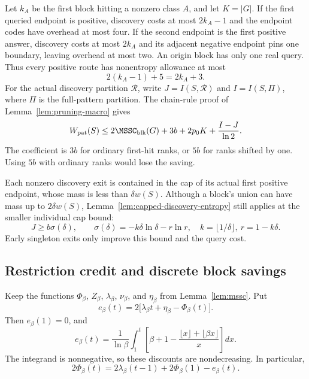 Let $k_A$ be the first block hitting a nonzero class $A$, and let
$K=|G|$. If the first queried endpoint is positive, discovery costs
at most $2k_A-1$ and the endpoint codes have overhead at most four.
If the second endpoint is the first positive answer, discovery costs
at most $2k_A$ and its adjacent negative endpoint pins one boundary,
leaving overhead at most two. An origin block has only one real query.
Thus every positive route has nonentropy allowance at most
\[
 2(k_A-1)+5=2k_A+3.
\]
For the actual discovery partition $\mathcal R$, write
$J=I(S,\mathcal R)$ and $I=I(S,\Pi)$, where $\Pi$ is the full-pattern
partition. The chain-rule proof of Lemma~\ref{lem:pruning-macro} gives
\begin{equation}\label{eq:poly-block-stage}
 W_{\mathrm{pat}}(S)\le
 2\MSSC_{\mathrm{blk}}(G)+3b+2p_0K+\frac{I-J}{\ln2}.
\end{equation}
The coefficient is $3b$ for ordinary first-hit ranks, or $5b$ for ranks
shifted by one. Using $5b$ with ordinary ranks would lose the saving.

Each nonzero discovery exit is contained in the cap of its actual
first positive endpoint, whose mass is less than $\delta w(S)$.
Although a block's union can have mass up to $2\delta w(S)$,
Lemma~\ref{lem:capped-discovery-entropy} still applies at the smaller
individual cap bound:
\begin{equation}\label{eq:poly-block-entropy}
 J\ge b\sigma(\delta),\qquad
 \sigma(\delta)=-k\delta\ln\delta-r\ln r,
 \quad k=\lfloor1/\delta\rfloor,\ r=1-k\delta.
\end{equation}
Early singleton exits only improve this bound and the query cost.

\subsection{Restriction credit and discrete block savings}

Keep the functions $\Phi_\beta$, $Z_\beta$, $\lambda_\beta$,
$\nu_\beta$, and $\eta_\beta$ from Lemma~\ref{lem:mssc}. Put
\[
 e_\beta(t)=2\bigl[\lambda_\beta t+\eta_\beta-\Phi_\beta(t)\bigr].
\]
Then $e_\beta(1)=0$, and
\[
 e_\beta(t)=\frac1{\ln\beta}\int_1^t
 \left[\beta+1-\frac{\lfloor x\rfloor+\lfloor\beta x\rfloor}{x}\right]dx.
\]
The integrand is nonnegative, so these discounts are nondecreasing.
In particular,
\begin{equation}\label{eq:poly-block-phi}
 2\Phi_\beta(t)=2\lambda_\beta(t-1)+2\Phi_\beta(1)-e_\beta(t).
\end{equation}

